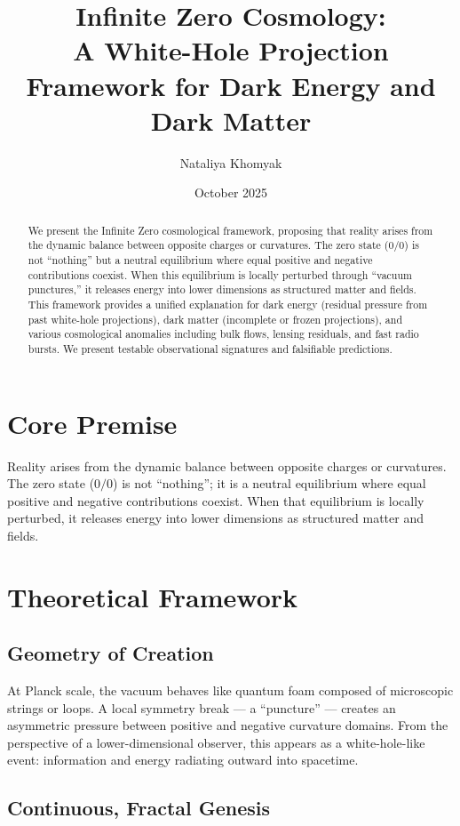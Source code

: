 \documentclass[11pt,a4paper]{article}
\title{Infinite Zero Cosmology: \\
A White-Hole Projection Framework for Dark Energy and Dark Matter}
\author{Nataliya Khomyak}
\date{October 2025}
\begin{document}
\maketitle

\begin{abstract}
We present the Infinite Zero cosmological framework, proposing that reality arises from the dynamic balance between opposite charges or curvatures. The zero state ($0/0$) is not ``nothing'' but a neutral equilibrium where equal positive and negative contributions coexist. When this equilibrium is locally perturbed through ``vacuum punctures,'' it releases energy into lower dimensions as structured matter and fields. This framework provides a unified explanation for dark energy (residual pressure from past white-hole projections), dark matter (incomplete or frozen projections), and various cosmological anomalies including bulk flows, lensing residuals, and fast radio bursts. We present testable observational signatures and falsifiable predictions.
\end{abstract}

\section{Core Premise}

Reality arises from the dynamic balance between opposite charges or curvatures. The zero state ($0/0$) is not ``nothing''; it is a neutral equilibrium where equal positive and negative contributions coexist. When that equilibrium is locally perturbed, it releases energy into lower dimensions as structured matter and fields.

\section{Theoretical Framework}

\subsection{Geometry of Creation}

At Planck scale, the vacuum behaves like quantum foam composed of microscopic strings or loops. A local symmetry break --- a ``puncture'' --- creates an asymmetric pressure between positive and negative curvature domains. From the perspective of a lower-dimensional observer, this appears as a white-hole-like event: information and energy radiating outward into spacetime.

\subsection{Continuous, Fractal Genesis}
\end{document}
